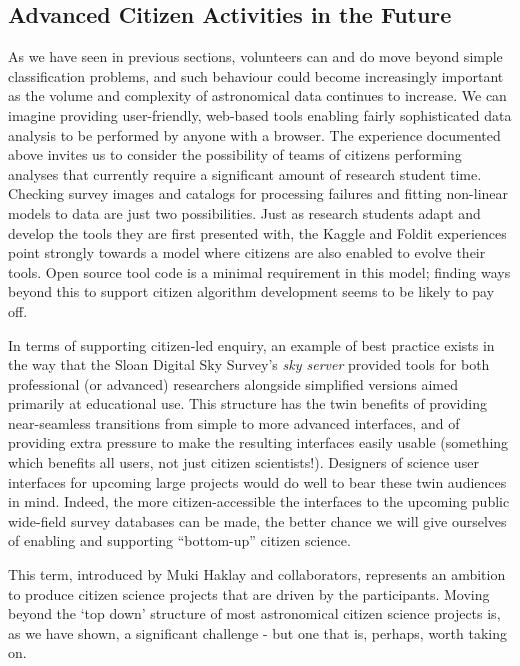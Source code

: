 \documentclass{ar2e}
\begin{document}
\subsection{Advanced Citizen Activities in the Future}

As we have seen in previous sections, volunteers can and do move beyond simple
classification problems, and such behaviour could become increasingly important
as the volume and complexity of astronomical data continues to increase.  We can
imagine providing user-friendly, web-based tools enabling  fairly sophisticated
data analysis to be performed by anyone with a browser. The experience
documented above invites us to consider the possibility of teams of citizens 
performing analyses that currently require a significant amount of research
student time.  Checking survey images and catalogs  for processing failures and
fitting non-linear models to data are just two possibilities. Just as research
students adapt and develop the tools they are first presented with, the Kaggle
and Foldit experiences point strongly towards a model where citizens are also
enabled to evolve their tools. Open source tool code is a minimal requirement in
this model; finding ways beyond this to support citizen algorithm development
seems to be likely to pay off.

In terms of supporting citizen-led enquiry, an example of best practice exists
in the way that the Sloan Digital Sky Survey's \textit{sky server} provided
tools
for both professional (or advanced) researchers alongside simplified versions
aimed primarily at educational use. This structure has the twin benefits of
providing near-seamless transitions from simple to more advanced interfaces, and
of providing extra pressure to make the resulting interfaces easily usable 
(something which benefits all users, not just citizen scientists!). Designers of
science user interfaces for upcoming large projects would do well to bear these
twin audiences in mind. Indeed, the more citizen-accessible the interfaces to
the upcoming public wide-field survey databases can be made, the better chance
we will give ourselves of enabling and supporting ``bottom-up'' citizen
science.  

This term, introduced by Muki Haklay and collaborators, represents an ambition
to produce citizen science projects that are driven by the participants. Moving
beyond the `top down' structure of most astronomical citizen science projects
is, as we have shown, a significant challenge - but one that is, perhaps, worth
taking on. 
\end{document}
